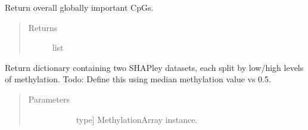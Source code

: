 \documentclass[letterpaper,10pt,english]{sphinxmanual}
\begin{document}
\begin{fulllineitems}
\begin{fulllineitems}
\end{fulllineitems}


\begin{fulllineitems}
\label{\detokenize{index:methylnet.interpretation_classes.ShapleyDataExplorer.return_global_importance_cpgs}}
Return overall globally important CpGs.
\begin{quote}\begin{description}
\item[{Returns}] \leavevmode\begin{description}
\item[{list}] \leavevmode
\end{description}

\end{description}\end{quote}

\end{fulllineitems}


\begin{fulllineitems}
\label{\detokenize{index:methylnet.interpretation_classes.ShapleyDataExplorer.return_shapley_data_by_methylation_status}}
Return dictionary containing two SHAPley datasets, each split by low/high levels of methylation. Todo: Define this using median methylation value vs 0.5.
\begin{quote}\begin{description}
\item[{Parameters}] \leavevmode\begin{description}
\item[{}] \leavevmode{[}type{]}
MethylationArray instance.

\end{description}


\end{description}
\end{quote}
\end{fulllineitems}
\end{fulllineitems}
\end{document}
